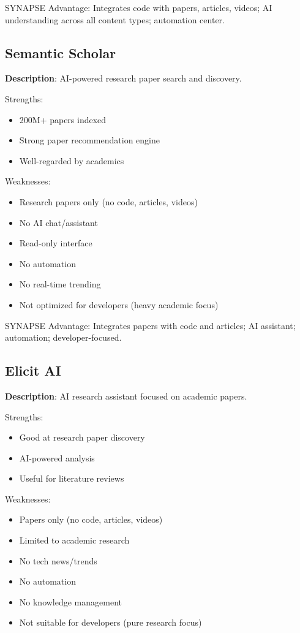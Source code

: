 \documentclass{report}
\begin{document}
SYNAPSE Advantage: Integrates code with papers, articles, videos; AI understanding across all content types; automation center.

\subsection{Semantic Scholar}

\textbf{Description}: AI-powered research paper search and discovery.

Strengths:
\begin{itemize}
    \item 200M+ papers indexed
    \item Strong paper recommendation engine
    \item Well-regarded by academics
\end{itemize}

Weaknesses:
\begin{itemize}
    \item Research papers only (no code, articles, videos)
    \item No AI chat/assistant
    \item Read-only interface
    \item No automation
    \item No real-time trending
    \item Not optimized for developers (heavy academic focus)
\end{itemize}

SYNAPSE Advantage: Integrates papers with code and articles; AI assistant; automation; developer-focused.

\subsection{Elicit AI}

\textbf{Description}: AI research assistant focused on academic papers.

Strengths:
\begin{itemize}
    \item Good at research paper discovery
    \item AI-powered analysis
    \item Useful for literature reviews
\end{itemize}

Weaknesses:
\begin{itemize}
    \item Papers only (no code, articles, videos)
    \item Limited to academic research
    \item No tech news/trends
    \item No automation
    \item No knowledge management
    \item Not suitable for developers (pure research focus)
\end{itemize}
\end{document}
